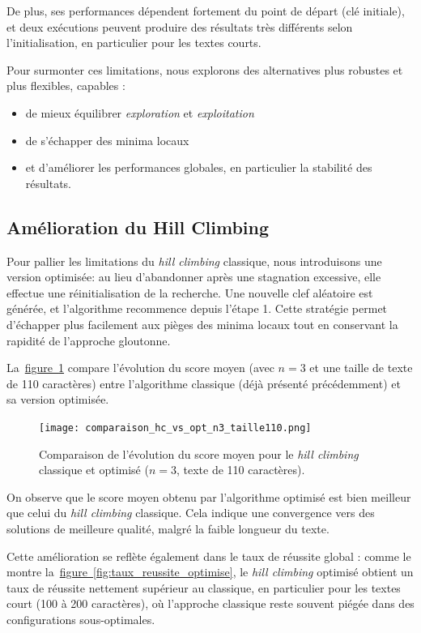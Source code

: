 \documentclass[a4paper]{article}
\newcommand{\figref}[1]{\hyperref[#1]{figure~\ref*{#1}}}
\begin{document}
De plus, ses performances dépendent fortement du point de départ (clé initiale), et deux exécutions peuvent produire des résultats très différents selon l’initialisation, en particulier pour les textes courts.

Pour surmonter ces limitations, nous explorons des alternatives plus robustes et plus flexibles, capables :
\begin{itemize}
    \item de mieux équilibrer \textit{exploration} et \textit{exploitation}
    \item de s’échapper des minima locaux
    \item et d’améliorer les performances globales, en particulier la stabilité des résultats.
\end{itemize}


\subsection{Amélioration du Hill Climbing}

Pour pallier les limitations du \textit{hill climbing} classique, nous introduisons une version optimisée: au lieu d’abandonner après une
stagnation excessive, elle effectue une réinitialisation de la recherche. Une nouvelle clef aléatoire est
générée, et l’algorithme recommence depuis l’étape 1. Cette stratégie permet d’échapper plus facilement aux pièges des minima locaux tout en conservant la rapidité de l’approche gloutonne.

La~\figref{fig:hc_optimise_score} compare l’évolution du score moyen (avec $n=3$ et une taille de texte de 110 caractères) entre l’algorithme classique (déjà présenté précédemment) et sa version optimisée.

\begin{figure}[H]
    \centering
    \texttt{[image: comparaison\_hc\_vs\_opt\_n3\_taille110.png]}
    \caption{Comparaison de l’évolution du score moyen pour le \textit{hill climbing} classique et optimisé ($n=3$, texte de 110 caractères).}
    \label{fig:hc_optimise_score}
\end{figure}

On observe que le score moyen obtenu par l’algorithme optimisé est bien meilleur que celui du \textit{hill climbing} classique. Cela indique une convergence vers des solutions de meilleure qualité, malgré la faible longueur du texte.

Cette amélioration se reflète également dans le taux de réussite global : comme le montre la~\figref{fig:taux_reussite_optimise}, le \textit{hill climbing} optimisé obtient un taux de réussite nettement supérieur au classique, en particulier pour les textes court (100 à 200 caractères), où l’approche classique reste souvent piégée dans des configurations sous-optimales.
\end{document}
